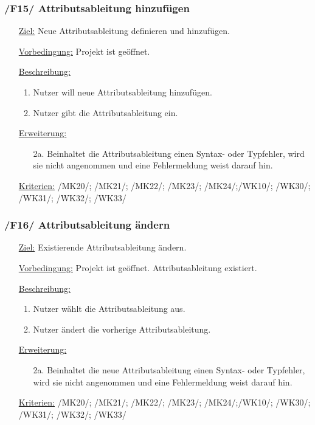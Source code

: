\documentclass{article}
\begin{document}
\subsubsection*{/F15/ Attributsableitung hinzufügen}
\begin{itemize}
    \item[\underline{Ziel:}] Neue Attributsableitung definieren und hinzufügen. 
    \item[\underline{Vorbedingung:}] Projekt ist geöffnet.
    \item[\underline{Beschreibung:}]
    \begin{enumerate}
        \item Nutzer will neue Attributsableitung hinzufügen.
        \item Nutzer gibt die Attributsableitung ein.
    \end{enumerate}
    \item[\underline{Erweiterung:}]
    \begin{itemize}
        \item[2a.] Beinhaltet die Attributsableitung einen Syntax- oder Typfehler, wird sie nicht angenommen und eine Fehlermeldung weist darauf hin.
    \end{itemize}
    \item[\underline{Kriterien:}] /MK20/; /MK21/; /MK22/; /MK23/; /MK24/;\newline/WK10/; /WK30/; /WK31/; /WK32/; /WK33/
\end{itemize}

\subsubsection*{/F16/ Attributsableitung ändern}
\begin{itemize}
    \item[\underline{Ziel:}] Existierende Attributsableitung ändern.
    \item[\underline{Vorbedingung:}] Projekt ist geöffnet. Attributsableitung existiert.
    \item[\underline{Beschreibung:}]
    \begin{enumerate}
        \item Nutzer wählt die Attributsableitung aus.
        \item Nutzer ändert die vorherige Attributsableitung.
    \end{enumerate}
    \item[\underline{Erweiterung:}]
    \begin{itemize}
        \item[2a.] Beinhaltet die neue Attributsableitung einen Syntax- oder Typfehler, wird sie nicht angenommen und eine Fehlermeldung weist darauf hin.
    \end{itemize}
    \item[\underline{Kriterien:}] /MK20/; /MK21/; /MK22/; /MK23/; /MK24/;\newline/WK10/; /WK30/; /WK31/; /WK32/; /WK33/
\end{itemize}
\end{document}
